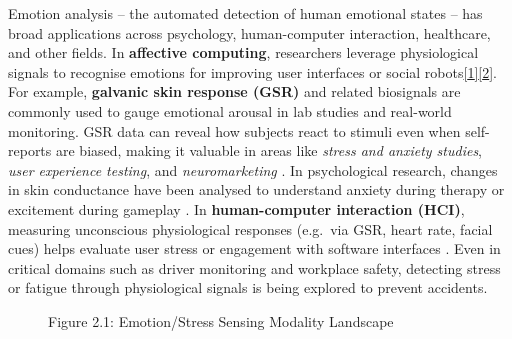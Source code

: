 \documentclass[12pt,a4paper]{article}
\begin{document}
Emotion analysis -- the automated detection of human emotional states -- has broad applications across psychology, human-computer interaction, healthcare, and other fields. In \textbf{affective computing}, researchers leverage physiological signals to recognise emotions for improving user interfaces or social robots\href{https://www.mdpi.com/2076-3417/10/8/2924\#:~:text=primarily\%20use\%20visual\%20information\%20for,it\%20might\%20be\%20possible\%20to}{{[}1{]}}\href{https://www.mdpi.com/2076-3417/10/8/2924\#:~:text=such\%20as\%20those\%20that\%20can,affective\%20computing\%20for\%20human\%E2\%80\%93robot\%20interaction}{{[}2{]}}. For example, \textbf{galvanic skin response (GSR)} and related biosignals are commonly used to gauge emotional arousal in lab studies and real-world monitoring. GSR data can reveal how subjects react to stimuli even when self-reports are biased, making it valuable in areas like \emph{stress and anxiety studies}, \emph{user experience testing}, and \emph{neuromarketing} \citep{Boucsein2012}. In psychological research, changes in skin conductance have been analysed to understand anxiety during therapy or excitement during gameplay \citep{Boucsein2012}. In \textbf{human-computer interaction (HCI)}, measuring unconscious physiological responses (e.g.~via GSR, heart rate, facial cues) helps evaluate user stress or engagement with software interfaces \citep{Boucsein2012}. Even in critical domains such as driver monitoring and workplace safety, detecting stress or fatigue through physiological signals is being explored to prevent accidents.

\begin{figure}
\centering
{}
\caption{Figure 2.1: Emotion/Stress Sensing Modality Landscape}
\end{figure}
\end{document}
